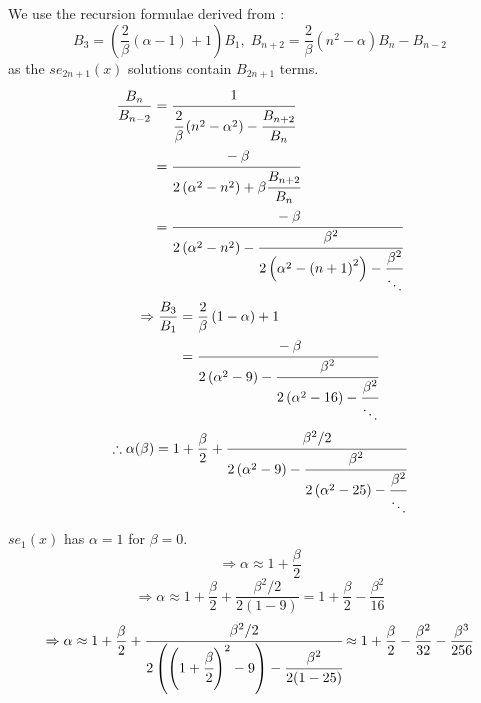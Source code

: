 \item

We use the recursion formulae derived from :
\[
    B_3 = \left( \frac{2}{\beta} \left( \alpha - 1 \right) + 1 \right) B_1,\;
    B_{n + 2} = \frac{2}{\beta} \left( n^2 - \alpha \right) B_n - B_{n - 2}
\]
as the $se_{2n + 1}(x)$ solutions contain $B_{2n + 1}$ terms.
\begin{align*}
    \frac{B_n}{B_{n - 2}}
    &= \cfrac{1}{
        \cfrac{2}{\beta} \left( n^2 - \alpha^2 \right)
        - \cfrac{B_{n + 2}}{B_n}
    } \\
    &= \cfrac{-\beta}{
        2\left( \alpha^2 - n^2 \right)
        + \beta \cfrac{B_{n + 2}}{B_n}
    } \\
    &= \cfrac{-\beta}{
        2\left( \alpha^2 - n^2 \right)
        - \cfrac{\beta^2}{
            2\left( \alpha^2 - {(n + 1)}^2 \right)
            - \cfrac{\beta^2}{\ddots}
        }
    }
\end{align*}
\begin{align*}
    \Rightarrow \frac{B_3}{B_1}
    &= \frac{2}{\beta} \left( 1 - \alpha \right) + 1 \\
    &= \cfrac{-\beta}{
        2\left( \alpha^2 - 9 \right)
        - \cfrac{\beta^2}{
            2\left( \alpha^2 - 16 \right)
            - \cfrac{\beta^2}{\ddots}
        }
    }
\end{align*}
\[
    \therefore \alpha(\beta)
    = 1 + \frac{\beta}{2} + \cfrac{\beta^2 / 2}{
        2\left( \alpha^2 - 9 \right)
        - \cfrac{\beta^2}{
            2 \left( \alpha^2 - 25 \right)
            - \cfrac{\beta^2}{\ddots}
        }
    }
\]

$se_1(x)$ has $\alpha = 1$ for $\beta = 0$.
\[
    \Rightarrow \alpha
    \approx 1 + \frac{\beta}{2}
\]
\[
    \Rightarrow \alpha
    \approx 1 + \frac{\beta}{2} + \frac{\beta^2 / 2}{2(1 - 9)}
    = 1 + \frac{\beta}{2} - \frac{\beta^2}{16}
\]
\[
    \Rightarrow \alpha
    \approx 1 + \frac{\beta}{2} + \cfrac{\beta^2 / 2}{
        2\left( {\left( 1 + \cfrac{\beta}{2} \right)}^2 - 9 \right)
        - \cfrac{\beta^2}{2(1 - 25)}
    }
    \approx 1 + \frac{\beta}{2} - \frac{\beta^2}{32} - \frac{\beta^3    }{256}
\]
